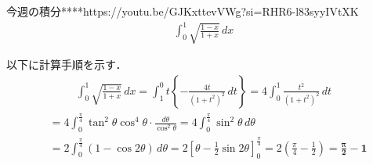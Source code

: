 \documentclass[main]{subfiles}
\begin{document}

\begin{mondai}{3}{今週の積分}{****}{https://youtu.be/GJKxttevVWg?si=RHR6-l83syyIVtXK}
    \begin{align*}
        \int_0^1 \sqrt{\frac{1-x}{1+x}} \, dx
    \end{align*}
\end{mondai}


\solutionhead
\hfill
以下に計算手順を示す．
\hfill\
\begin{align*}
    \int ^1_0 \sqrt{\frac{1-x}{1+x}} \, dx
        = \int ^0_1 t \left\{ -\frac{4t}{(1+t^2)^2} \, dt \right\}
        = 4 \int ^1_0 \frac{t^2}{(1+t^2)^2} \, dt
\end{align*}
\begin{align*}
        &= 4\int^{\frac{\pi}{4}}_0 \tan^2\theta\cos^4\theta\cdot\frac{d\theta}{\cos^2\theta}
        = 4\int^{\frac{\pi}{4}}_0 \sin^2\theta \, d\theta \\
        &= 2\int^{\frac{\pi}{4}}_0 \left(1-\cos 2\theta\right) \, d\theta
        = 2\left[ \theta-\frac{1}{2}\sin 2\theta \right]_0^{\frac{\pi}{4}}
        = 2\left( \frac{\pi}{4}-\frac{1}{2} \right)
        = \boldsymbol{\frac{\pi}{2}-1}
\end{align*}
\end{document}
